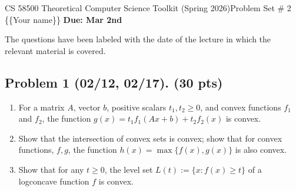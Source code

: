 \documentclass[12pt]{article}
\theoremstyle{plain}
\theoremstyle{definition}
\begin{document}
\noindent CS 58500 Theoretical Computer Science Toolkit (Spring 2026)\hfill Problem Set \# 2\\
\{\{Your name\}\} \hfill \textbf{Due: Mar 2nd}

\noindent\hrulefill

The questions have been labeled with the date of the lecture in which the relevant material is covered.

\subsection*{Problem 1 (02/12, 02/17). (30 pts)}
\begin{enumerate}
\item For a matrix $A$, vector $b$, positive scalars $t_1, t_2 \geq 0$, and convex functions $f_1$ and $f_2$, the
function $g(x) = t_1f_1(Ax + b) + t_2f_2(x)$ is convex.
\item Show that the intersection of convex sets is convex; show that for convex functions, $f, g$, the function $h(x) = \max\{f(x), g(x)\}$ is also convex.
\item Show that for any $t\geq 0$, the level set $L(t):= \{x : f(x) \geq t\}$ of a logconcave function $f$ is convex.
\end{enumerate}

 \newline
\   %
\newpage
\end{document}
